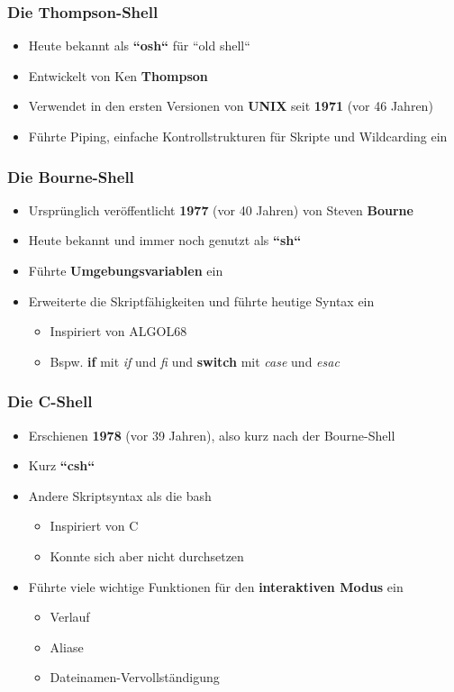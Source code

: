 \begin{frame}
    \frametitle{Die Thompson-Shell}
    \begin{itemize}
        \item Heute bekannt als \textbf{``osh``} für ``old shell``
        \item Entwickelt von Ken \textbf{Thompson}
        \item Verwendet in den ersten Versionen von \textbf{UNIX} seit \textbf{1971} (vor 46 Jahren)
        \item Führte Piping, einfache Kontrollstrukturen für Skripte und Wildcarding ein
    \end{itemize}
\end{frame}

\begin{frame}
    \frametitle{Die Bourne-Shell}
    \begin{itemize}
        \item Ursprünglich veröffentlicht \textbf{1977} (vor 40 Jahren) von Steven \textbf{Bourne}
        \item Heute bekannt und immer noch genutzt als \textbf{``sh``}
        \item Führte \textbf{Umgebungsvariablen} ein
        \item Erweiterte die Skriptfähigkeiten und führte heutige Syntax ein
        \begin{itemize}
            \item Inspiriert von ALGOL68
            \item Bspw. \textbf{if} mit \textit{if} und \textit{fi} und \textbf{switch} mit \textit{case} und \textit{esac}
        \end{itemize}
    \end{itemize}
\end{frame}

\begin{frame}
    \frametitle{Die C-Shell}
    \begin{itemize}
        \item Erschienen \textbf{1978} (vor 39 Jahren), also kurz nach der Bourne-Shell
        \item Kurz \textbf{``csh``}
        \item Andere Skriptsyntax als die bash
        \begin{itemize}
            \item Inspiriert von C
            \item Konnte sich aber nicht durchsetzen
        \end{itemize}
        \item Führte viele wichtige Funktionen für den \textbf{interaktiven Modus} ein
        \begin{itemize}
            \item Verlauf
            \item Aliase
            \item Dateinamen-Vervollständigung
        \end{itemize}
    \end{itemize}
\end{frame}

